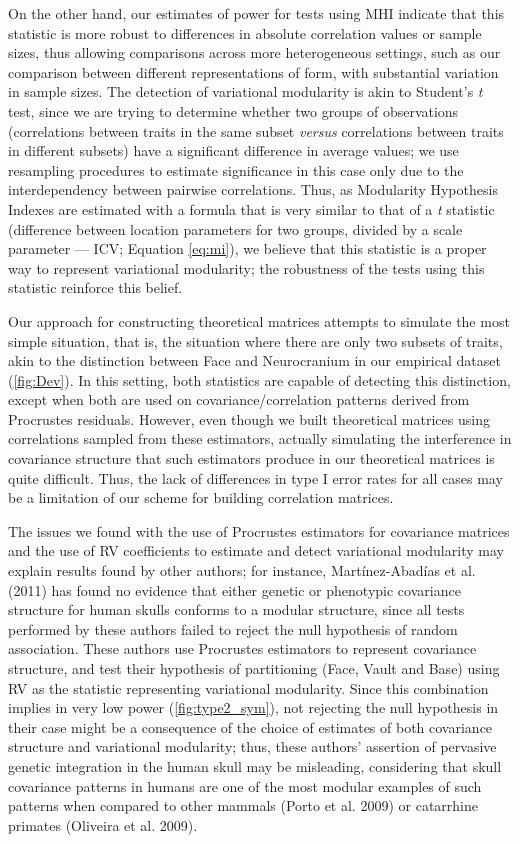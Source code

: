 \documentclass[12pt,]{article}
\begin{document}
On the other hand, our estimates of power for tests using MHI indicate
that this statistic is more robust to differences in absolute
correlation values or sample sizes, thus allowing comparisons across
more heterogeneous settings, such as our comparison between different
representations of form, with substantial variation in sample sizes. The
detection of variational modularity is akin to Student's \emph{t} test,
since we are trying to determine whether two groups of observations
(correlations between traits in the same subset \emph{versus}
correlations between traits in different subsets) have a significant
difference in average values; we use resampling procedures to estimate
significance in this case only due to the interdependency between
pairwise correlations. Thus, as Modularity Hypothesis Indexes are
estimated with a formula that is very similar to that of a \emph{t}
statistic (difference between location parameters for two groups,
divided by a scale parameter --- ICV; Equation \ref{eq:mi}), we believe
that this statistic is a proper way to represent variational modularity;
the robustness of the tests using this statistic reinforce this belief.

Our approach for constructing theoretical matrices attempts to simulate
the most simple situation, that is, the situation where there are only
two subsets of traits, akin to the distinction between Face and
Neurocranium in our empirical dataset (\autoref{fig:Dev}). In this
setting, both statistics are capable of detecting this distinction,
except when both are used on covariance/correlation patterns derived
from Procrustes residuals. However, even though we built theoretical
matrices using correlations sampled from these estimators, actually
simulating the interference in covariance structure that such estimators
produce in our theoretical matrices is quite difficult. Thus, the lack
of differences in type I error rates for all cases may be a limitation
of our scheme for building correlation matrices.

The issues we found with the use of Procrustes estimators for covariance
matrices and the use of RV coefficients to estimate and detect
variational modularity may explain results found by other authors; for
instance, Martínez-Abadías et al. (2011) has found no evidence that
either genetic or phenotypic covariance structure for human skulls
conforms to a modular structure, since all tests performed by these
authors failed to reject the null hypothesis of random association.
These authors use Procrustes estimators to represent covariance
structure, and test their hypothesis of partitioning (Face, Vault and
Base) using RV as the statistic representing variational modularity.
Since this combination implies in very low power
(\autoref{fig:type2_sym}), not rejecting the null hypothesis in their
case might be a consequence of the choice of estimates of both
covariance structure and variational modularity; thus, these authors'
assertion of pervasive genetic integration in the human skull may be
misleading, considering that skull covariance patterns in humans are one
of the most modular examples of such patterns when compared to other
mammals (Porto et al. 2009) or catarrhine primates (Oliveira et al.
2009).
\end{document}
